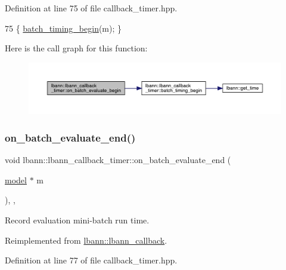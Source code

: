 Definition at line 75 of file callback\+\_\+timer.\+hpp.


\begin{DoxyCode}
75 \{ \hyperlink{classlbann_1_1lbann__callback__timer_a6a8a59707a52b8b570b7605b90fdd159}{batch\_timing\_begin}(m); \}
\end{DoxyCode}
Here is the call graph for this function\+:\nopagebreak
\begin{figure}[H]
\begin{center}
\leavevmode
\includegraphics[width=350pt]{classlbann_1_1lbann__callback__timer_abef3c43404a7453a383fe47728d3283b_cgraph}
\end{center}
\end{figure}
\mbox{\label{classlbann_1_1lbann__callback__timer_a1a041e3b7cc2cfea68200d9467d3eaaf}} 
\subsubsection{\texorpdfstring{on\+\_\+batch\+\_\+evaluate\+\_\+end()}{on\_batch\_evaluate\_end()}}
{\footnotesize\ttfamily void lbann\+::lbann\+\_\+callback\+\_\+timer\+::on\+\_\+batch\+\_\+evaluate\+\_\+end (\begin{DoxyParamCaption}\item[{\hyperlink{classlbann_1_1model}{model} $\ast$}]{m }\end{DoxyParamCaption})\hspace{0.3cm}{\ttfamily [inline]}, {\ttfamily [override]}, {\ttfamily [virtual]}}

Record evaluation mini-\/batch run time. 

Reimplemented from \hyperlink{classlbann_1_1lbann__callback_ad10891b8ab3de74ee1a70e6255e7d58a}{lbann\+::lbann\+\_\+callback}.



Definition at line 77 of file callback\+\_\+timer.\+hpp.


